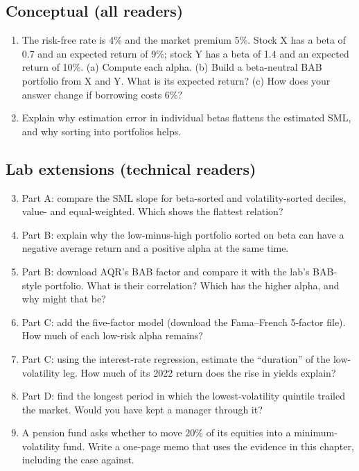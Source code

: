 \subsection*{Conceptual (all readers)}

\begin{enumerate}
  \item The risk-free rate is 4\% and the market premium 5\%. Stock X has a beta of 0.7 and an expected return of 9\%; stock Y has a beta of 1.4 and an expected return of 10\%. (a) Compute each alpha. (b) Build a beta-neutral BAB portfolio from X and Y. What is its expected return? (c) How does your answer change if borrowing costs 6\%?
  \item Explain why estimation error in individual betas flattens the estimated SML, and why sorting into portfolios helps.
\end{enumerate}

\subsection*{Lab extensions (technical readers)}

\begin{enumerate}
  \setcounter{enumi}{2}
  \item Part A: compare the SML slope for beta-sorted and volatility-sorted deciles, value- and equal-weighted. Which shows the flattest relation?
  \item Part B: explain why the low-minus-high portfolio sorted on beta can have a negative average return and a positive alpha at the same time.
  \item Part B: download AQR's BAB factor and compare it with the lab's BAB-style portfolio. What is their correlation? Which has the higher alpha, and why might that be?
  \item Part C: add the five-factor model (download the Fama--French 5-factor file). How much of each low-risk alpha remains?
  \item Part C: using the interest-rate regression, estimate the ``duration'' of the low-volatility leg. How much of its 2022 return does the rise in yields explain?
  \item Part D: find the longest period in which the lowest-volatility quintile trailed the market. Would you have kept a manager through it?
  \item A pension fund asks whether to move 20\% of its equities into a minimum-volatility fund. Write a one-page memo that uses the evidence in this chapter, including the case against.
\end{enumerate}
